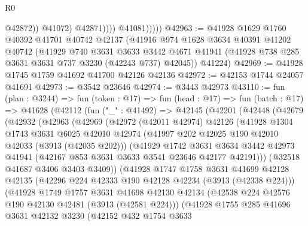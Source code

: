 \begin{lexlean}{R0}
\begin{coremodule}
                            @42872))
                        @41072)
                      @42871))))
              @41081)))))
@42963 := @41928
    @1629
    @1760
    @40392
    @41701
    @40742
    @42137
    (@41916
      @974
      @1628
      @3634
      @40391
      @41202
      @40742
      (@41929
        @740
        @3631
        @3633
        @3442
        @4671
        @41941
        (@41928 @738 @285 @3631 @3631 @737 @3230 (@42243 @737) @42045))
      @41224)
@42969 := @41928 @1745 @1759 @41692 @41700 @42126 @42136
@42972 := @42153 @1744 @24057 @41691
@42973 := @3542 @23646
@42974 := @3443 @42973
@43110 := fun (plan : @3244) =>
  fun (token : @17) =>
  fun (head : @17) =>
  fun (batch : @17) =>
  @41628
    (@42112
      (fun ("_" : @41492) =>
      @42145
        (@42201
          (@42448
            (@42679
              (@42932
                (@42963
                  (@42969
                    (@42972
                      (@42011 @42974)
                      @42126
                      (@41928
                        @1304
                        @1743
                        @3631
                        @6025
                        @42010
                        @42974
                        (@41997 @202 @42025 @190 @42010 @42033 (@3913 (@42035 @202)))
                        (@41929
                          @1742
                          @3631
                          @3634
                          @3442
                          @42973
                          @41941
                          (@42167 @853 @3631 @3633 @3541 @23646 @42177 @42191)))
                      (@32518 @41687 @3406 @3403 @3409))
                    (@41928
                      @1747
                      @1758
                      @3631
                      @41699
                      @42128
                      @42135
                      (@42296 @224 @42333 @190 @42128 @42234 (@3913 (@42338 @224)))
                      (@41928
                        @1749
                        @1757
                        @3631
                        @41698
                        @42130
                        @42134
                        (@42538 @224 @42576 @190 @42130 @42481 (@3913 (@42581 @224)))
                        (@41928
                          @1755
                          @285
                          @41696
                          @3631
                          @42132
                          @3230
                          (@42152
                            @432
                            @1754
                            @3633

\end{coremodule}
\end{lexlean}
